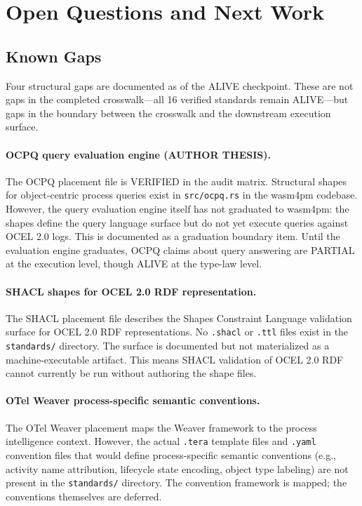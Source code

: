 
\section{Open Questions and Next Work}
\label{sec:standards-open}

\subsection{Known Gaps}
\label{sec:standards-open-gaps}

Four structural gaps are documented as of the ALIVE checkpoint. These are not gaps in the
completed crosswalk---all 16 verified standards remain ALIVE---but gaps in the boundary
between the crosswalk and the downstream execution surface.

\paragraph{OCPQ query evaluation engine (AUTHOR THESIS).}
The OCPQ placement file is VERIFIED in the audit matrix. Structural shapes for object-centric
process queries exist in \texttt{src/ocpq.rs} in the wasm4pm codebase. However, the query
evaluation engine itself has not graduated to wasm4pm: the shapes define the query language
surface but do not yet execute queries against OCEL 2.0 logs. This is documented as a
graduation boundary item. Until the evaluation engine graduates, OCPQ claims about query
answering are PARTIAL at the execution level, though ALIVE at the type-law level.

\paragraph{SHACL shapes for OCEL 2.0 RDF representation.}
The SHACL placement file describes the Shapes Constraint Language validation surface for
OCEL 2.0 RDF representations. No \texttt{.shacl} or \texttt{.ttl} files exist in the
\texttt{standards/} directory. The surface is documented but not materialized as a
machine-executable artifact. This means SHACL validation of OCEL 2.0 RDF cannot currently
be run without authoring the shape files.

\paragraph{OTel Weaver process-specific semantic conventions.}
The OTel Weaver placement maps the Weaver framework to the process intelligence context.
However, the actual \texttt{.tera} template files and \texttt{.yaml} convention files that
would define process-specific semantic conventions (e.g., activity name attribution, lifecycle
state encoding, object type labeling) are not present in the \texttt{standards/} directory.
The convention framework is mapped; the conventions themselves are deferred.

